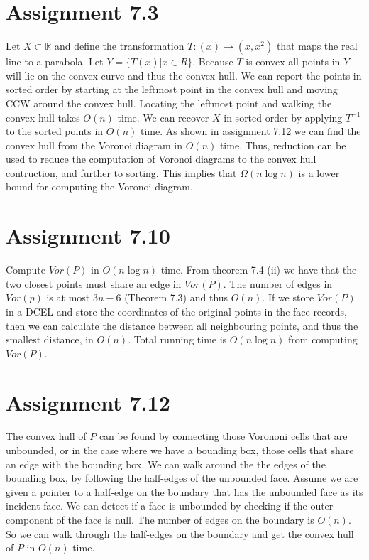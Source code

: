 \documentclass[10pt,a4paper,final,oneside,openany,article,oldfontcommands]{memoir}
\begin{document}
\chapter*{Assignment 7.3}
Let $X \subset \mathbb{R}$ and define the transformation $T : (x) \to (x,
x^2)$ that maps the real line to a parabola. Let $Y = \{T(x) | x \in R\}$.
Because $T$ is convex all points in $Y$ will lie on the convex curve and thus
the convex hull. We can report the points in sorted order by starting at the
leftmost point in the convex hull and moving CCW around the convex hull.
Locating the leftmost point and walking the convex hull takes $O(n)$ time.
We can recover $X$ in sorted order by applying $T^{-1}$ to the sorted points
in $O(n)$ time. As shown in assignment 7.12 we can find the convex hull from
the Voronoi diagram in $O(n)$ time. Thus, reduction can be used to reduce the
computation of Voronoi diagrams to the convex hull contruction, and further to
sorting. This implies that $\Omega(n \log n)$ is a lower bound for computing
the Voronoi diagram.

\chapter*{Assignment 7.10}
Compute $Vor(P)$ in $O(n \log n)$ time. From theorem 7.4 (ii) we have that
the two closest points must share an edge in $Vor(P)$. The number of edges in
$Vor(p)$ is at most $3n-6$ (Theorem 7.3) and thus $O(n)$. If we store
$Vor(P)$ in a DCEL and store the coordinates of the original points in the
face records, then we can calculate the distance between all neighbouring
points, and thus the smallest distance, in $O(n)$. Total running time is $O(n
\log n)$ from computing $Vor(P)$.


\chapter*{Assignment 7.12}
The convex hull of $P$ can be found by connecting those Vorononi cells that
are unbounded, or in the case where we have a bounding box, those cells that
share an edge with the bounding box. We can walk around the the edges of the
bounding box, by following the half-edges of the unbounded face. Assume we are
given a pointer to a half-edge on the boundary that has the unbounded face
as its incident face. We can detect if a face is unbounded by checking if
the outer component of the face is null. The number of edges on the boundary
is $O(n)$. So we can walk through the half-edges on the boundary and get the
convex hull of $P$ in $O(n)$ time.
\end{document}
